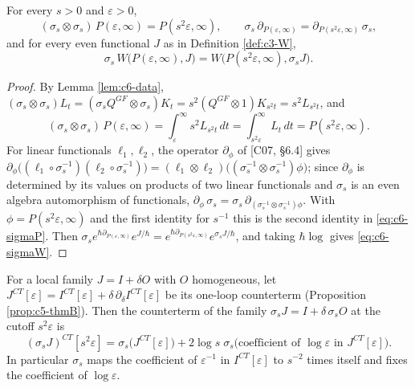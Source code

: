 \begin{proposition}
\label{prop:c6-scaling}
For every $s>0$ and $\varepsilon>0$,
\begin{equation}
(\sigma_s\otimes\sigma_s)\,P(\varepsilon,\infty)=P(s^2\varepsilon,\infty),\qquad \sigma_s\,\partial_{P(\varepsilon,\infty)}=\partial_{P(s^2\varepsilon,\infty)}\,\sigma_s ,
\label{eq:c6-sigmaP}
\end{equation}
and for every even functional $J$ as in Definition \ref{def:c3-W},
\begin{equation}
\sigma_s\,W\big(P(\varepsilon,\infty),J\big)=W\big(P(s^2\varepsilon,\infty),\sigma_s J\big).
\label{eq:c6-sigmaW}
\end{equation}
\end{proposition}

\begin{proof}
By Lemma \ref{lem:c6-data}, $(\sigma_s\otimes\sigma_s)L_t=(\sigma_s Q^{GF}\otimes\sigma_s)K_t=s^2(Q^{GF}\otimes1)K_{s^2t}=s^2L_{s^2t}$, and
\[
(\sigma_s\otimes\sigma_s)\,P(\varepsilon,\infty)=\int_\varepsilon^\infty s^2L_{s^2t}\,dt=\int_{s^2\varepsilon}^\infty L_{t}\,dt=P(s^2\varepsilon,\infty).
\]
For linear functionals $\ell_1,\ell_2$, the operator $\partial_\phi$ of [C07, §6.4] gives $\partial_\phi\big((\ell_1\circ\sigma_s^{-1})(\ell_2\circ\sigma_s^{-1})\big)=(\ell_1\otimes\ell_2)\big((\sigma_s^{-1}\otimes\sigma_s^{-1})\phi\big)$; since $\partial_\phi$ is determined by its values on products of two linear functionals and $\sigma_s$ is an even algebra automorphism of functionals, $\partial_\phi\,\sigma_s=\sigma_s\,\partial_{(\sigma_s^{-1}\otimes\sigma_s^{-1})\phi}$. With $\phi=P(s^2\varepsilon,\infty)$ and the first identity for $s^{-1}$ this is the second identity in \eqref{eq:c6-sigmaP}. Then $\sigma_s e^{\hbar\partial_{P(\varepsilon,\infty)}}e^{J/\hbar}=e^{\hbar\partial_{P(s^2\varepsilon,\infty)}}e^{\sigma_s J/\hbar}$, and taking $\hbar\log$ gives \eqref{eq:c6-sigmaW}.
\end{proof}

\begin{lemma}
\label{lem:c6-ct}
For a local family $J=I+\delta O$ with $O$ homogeneous, let $J^{CT}[\varepsilon]=I^{CT}[\varepsilon]+\delta\,\partial_\delta I^{CT}[\varepsilon]$ be its one-loop counterterm (Proposition \ref{prop:c5-thmB}). Then the counterterm of the family $\sigma_s J=I+\delta\,\sigma_s O$ at the cutoff $s^2\varepsilon$ is
\begin{equation}
(\sigma_s J)^{CT}[s^2\varepsilon]=\sigma_s\big(J^{CT}[\varepsilon]\big)+2\log s\;\sigma_s\big(\text{coefficient of }\log\varepsilon\text{ in }J^{CT}[\varepsilon]\big).
\label{eq:c6-ct}
\end{equation}
In particular $\sigma_s$ maps the coefficient of $\varepsilon^{-1}$ in $I^{CT}[\varepsilon]$ to $s^{-2}$ times itself and fixes the coefficient of $\log\varepsilon$.
\end{lemma}

